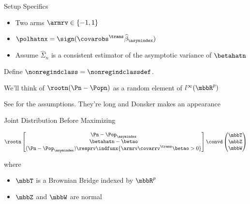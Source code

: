 \documentclass[aspectratio=169, professionalfonts, handout]{beamer}
\begin{document}
\begin{frame}{Setup Specifics}
	\begin{itemize}
		\item	Two arms $\armrv \in \{-1, 1\}$
		      \vfill

		\item $\polhatnx = \sign(\covarobs^{\trans}\widehat{\beta}_{\asymindex})$
		      \vfill

		\item Assume $\widehat{\Sigma}_n$ is a consistent estimator of the asymptotic variance of $\betahatn$
	\end{itemize}
	\vfill \pause

	Define $\nonregindclass = \nonregindclassdef$.
	\vfill

	We'll think of $\rootn(\Pn - \Popn)$ as a random element of $l^{\infty}(\mbbR^p)$
	\vfill

	\footnotesize
	See  for the assumptions. They're long and
	Donsker makes an appearance
\end{frame}

\begin{frame}{Joint Distribution Before Maximizing}

	\begin{displaymath}
		\rootn \begin{bmatrix}\Pn - \Pop_{\asymindex} \\
			\betahatn - \betao      \\
			(\Pn - \Pop_{\asymindex})\resprv \indfunx{\armrv \covarrv^{\trans}\betao
				> 0}\end{bmatrix} \convd \begin{pmatrix} \mbbT \\ \mbbZ \\
			\mbbW\end{pmatrix}
	\end{displaymath}

	where

	\begin{itemize}
		\item $\mbbT$ is a Brownian Bridge indexed by $\mbbR^p$
		\item $\mbbZ$ and $\mbbW$ are normal
	\end{itemize}
\end{frame}
\end{document}

